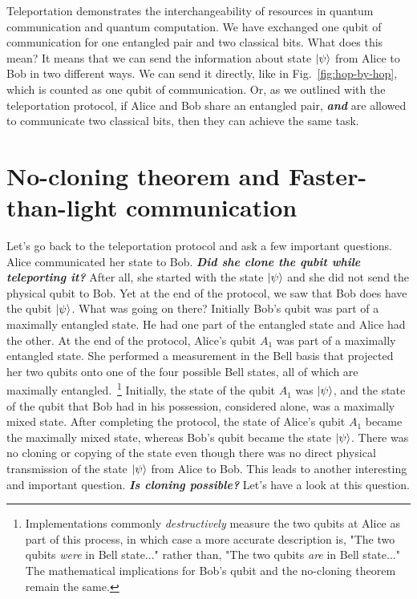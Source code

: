 Teleportation demonstrates the interchangeability of resources in quantum communication and quantum computation.
We have exchanged one qubit of communication for one entangled pair and two classical bits.
What does this mean?
It means that we can send the information about state $\left| \psi \right\rangle$ from Alice to Bob in two different ways.
We can send it directly, like in Fig.~\ref{fig:hop-by-hop}, which is counted as one qubit of communication.
Or, as we outlined with the teleportation protocol, if Alice and Bob share an entangled pair, \textbf{\emph{and}} are allowed to communicate two classical bits, then they can achieve the same task.



\section{No-cloning theorem and Faster-than-light communication}
\label{sec:8-3_no-cloning}

Let's go back to the teleportation protocol and ask a few important questions.
Alice communicated her state to Bob.
\textbf{\emph{Did she clone the qubit while teleporting it?}}
After all, she started with the state $\left| \psi \right\rangle$ and she did not send the physical qubit to Bob.
Yet at the end of the protocol, we saw that Bob does have the qubit $\left| \psi \right\rangle$.
What was going on there?
Initially Bob's qubit was part of a maximally entangled state.
He had one part of the entangled state and Alice had the other.
At the end of the protocol, Alice's qubit $A_1$ was part of a maximally entangled state.
She performed a measurement in the Bell basis that projected her two qubits onto one of the four possible Bell states, all of which are maximally entangled.~\footnote{Implementations commonly \emph{destructively} measure the two qubits at Alice as part of this process, in which case a more accurate description is, "The two qubits \emph{were} in Bell state..." rather than, "The two qubits \emph{are} in Bell state..." The mathematical implications for Bob's qubit and the no-cloning theorem remain the same.}
Initially, the state of the qubit $A_1$ was $\left| \psi \right\rangle$, and the state of the qubit that Bob had in his possession, considered alone, was a maximally mixed state.
After completing the protocol, the state of Alice's qubit $A_1$ became the maximally mixed state, whereas Bob's qubit became the state $\left| \psi \right\rangle$.
There was no cloning or copying of the state even though there was no direct physical transmission of the state $\left| \psi \right\rangle$ from Alice to Bob.
This leads to another interesting and important question.
\textbf{\emph{Is cloning possible?}}
Let's have a look at this question.

